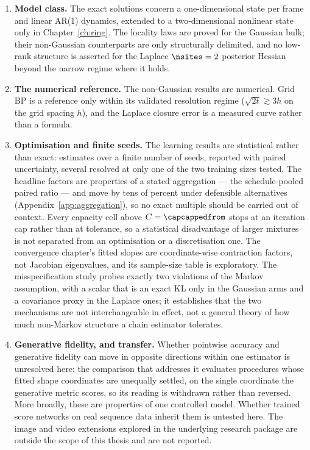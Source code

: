 \begin{enumerate}
  \item \textbf{Model class.} The exact solutions concern a one-dimensional
  state per frame and linear AR(1) dynamics, extended to a two-dimensional
  nonlinear state only in Chapter~\ref{ch:ring}. The locality laws are proved
  for the Gaussian bulk; their non-Gaussian counterparts are only structurally
  delimited, and no low-rank structure is asserted for the Laplace
  $\nsites = 2$ posterior Hessian beyond the narrow regime where it holds.

  \item \textbf{The numerical reference.} The non-Gaussian results are
  numerical. Grid BP is a reference only within its validated resolution regime
  ($\sqrt{2t} \gtrsim 3h$ on the grid spacing $h$), and the Laplace closure
  error is a measured curve rather than a formula.

  \item \textbf{Optimisation and finite seeds.} The learning results are
  statistical rather than exact: estimates over a finite number of seeds,
  reported with paired uncertainty, several resolved at only one of the two
  training sizes tested. The headline factors are properties of a stated
  aggregation --- the schedule-pooled paired ratio --- and move by tens of
  percent under defensible alternatives (Appendix~\ref{app:aggregation}), so
  no exact multiple should be carried out of context. Every capacity cell
  above $C = \capcappedfrom$ stops at
  an iteration cap rather than at tolerance, so a statistical disadvantage of
  larger mixtures is not separated from an optimisation or a discretisation one.
  The convergence chapter's fitted slopes are coordinate-wise contraction
  factors, not Jacobian eigenvalues, and its sample-size table is exploratory.
  The misspecification study probes exactly two violations of the Markov
  assumption, with a scalar that is an exact KL only in the Gaussian arms and
  a covariance proxy in the Laplace ones; it establishes that the two
  mechanisms are not interchangeable in effect, not
  a general theory of how much non-Markov structure a chain estimator tolerates.

  \item \textbf{Generative fidelity, and transfer.} Whether pointwise accuracy
  and generative fidelity can move in opposite directions within one estimator
  is unresolved here: the comparison that addresses it evaluates procedures
  whose fitted shape coordinates are unequally settled, on the single coordinate
  the generative metric scores, so its reading is withdrawn rather than
  reversed. More broadly, these are properties of one controlled model. Whether
  trained score networks on real sequence data inherit them is untested here.
  The image and video extensions explored in the underlying research package are
  outside the scope of this thesis and are not reported.
\end{enumerate}

